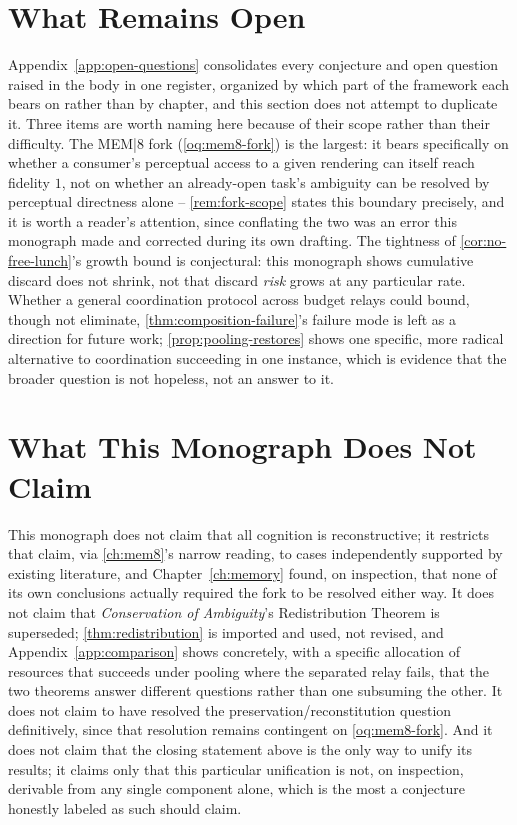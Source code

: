 \section{What Remains Open}

Appendix~\ref{app:open-questions} consolidates every conjecture and open
question raised in the body in one register, organized by which part of
the framework each bears on rather than by chapter, and this section
does not attempt to duplicate it. Three items are worth naming here
because of their scope rather than their difficulty. The MEM|8 fork
(\cref{oq:mem8-fork}) is the largest: it bears specifically on whether a
consumer's perceptual access to a given rendering can itself reach
fidelity $1$, not on whether an already-open task's ambiguity can be
resolved by perceptual directness alone -- \cref{rem:fork-scope} states
this boundary precisely, and it is worth a reader's attention, since
conflating the two was an error this monograph made and corrected during
its own drafting. The tightness of \cref{cor:no-free-lunch}'s growth
bound is conjectural: this monograph shows cumulative discard does not
shrink, not that discard \emph{risk} grows at any particular rate.
Whether a general coordination protocol across budget relays could
bound, though not eliminate, \cref{thm:composition-failure}'s failure
mode is left as a direction for future work; \cref{prop:pooling-restores}
shows one specific, more radical alternative to coordination succeeding
in one instance, which is evidence that the broader question is not
hopeless, not an answer to it.

\section{What This Monograph Does Not Claim}

This monograph does not claim that all cognition is reconstructive; it
restricts that claim, via \cref{ch:mem8}'s narrow reading, to cases
independently supported by existing literature, and Chapter~\ref{ch:memory}
found, on inspection, that none of its own conclusions actually required
the fork to be resolved either way. It does not claim that
\emph{Conservation of Ambiguity}'s Redistribution Theorem is superseded;
\cref{thm:redistribution} is imported and used, not revised, and
Appendix~\ref{app:comparison} shows concretely, with a specific
allocation of resources that succeeds under pooling where the separated
relay fails, that the two theorems answer different questions rather
than one subsuming the other. It does not claim to have resolved the
preservation/reconstitution question definitively, since that resolution
remains contingent on \cref{oq:mem8-fork}. And it does not claim that
the closing statement above is the only way to unify its results; it
claims only that this particular unification is not, on inspection,
derivable from any single component alone, which is the most a
conjecture honestly labeled as such should claim.

